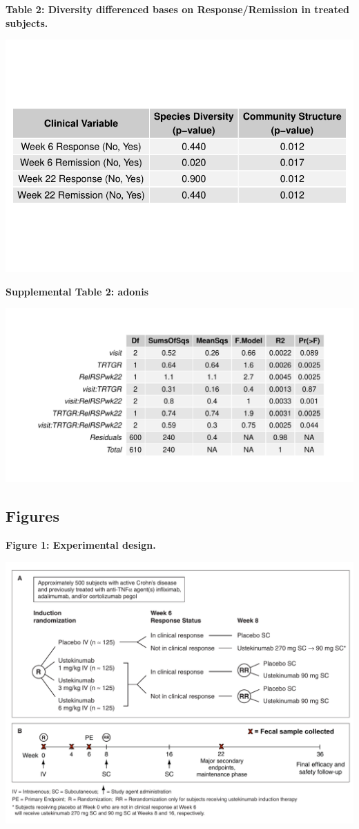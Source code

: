 \documentclass[11pt,]{article}
\begin{document}
\newpage

\textbf{Table 2: Diversity differenced bases on Response/Remission in
treated subjects.}

\includegraphics{tables/table2diversity.pdf}

\newpage

\textbf{Supplemental Table 2: adonis}

\includegraphics{tables/SF2adonis.pdf}

\newpage

\subsection{Figures}\label{figures}

\textbf{Figure 1: Experimental design.}

\includegraphics{figures/Figure1_expdesign.pdf}
\end{document}
